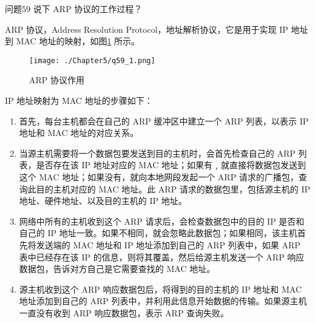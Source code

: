\documentclass[cn,11pt,color=blue,lang=cn]{elegantbook}
\begin{document}
\begin{custom}{问题59}
说下 ARP 协议的工作过程？
\end{custom}
\begin{solution}
ARP 协议，Address Resolution Protocol，地址解析协议，它是用于实现 IP 地址到 MAC 地址的映射，如图\ref{fig59_1} 所示。
\begin{figure}[!h]
\centering
\texttt{[image: ./Chapter5/q59\_1.png]}
\caption{ARP 协议作用}
\label{fig59_1}
\end{figure}

IP 地址映射为 MAC 地址的步骤如下：
\begin{enumerate}
	\item 首先，每台主机都会在自己的 ARP 缓冲区中建立一个 ARP 列表，以表示 IP 地址和 MAC 地址的对应关系。
	\item 当源主机需要将一个数据包要发送到目的主机时，会首先检查自己的 ARP 列表，是否存在该 IP 地址对应的 MAC 地址；如果有﹐就直接将数据包发送到这个 MAC 地址；如果没有，就向本地网段发起一个 ARP 请求的广播包，查询此目的主机对应的 MAC 地址。此 ARP 请求的数据包里，包括源主机的 IP 地址、硬件地址、以及目的主机的 IP 地址。
	\item 网络中所有的主机收到这个 ARP 请求后，会检查数据包中的目的 IP 是否和自己的 IP 地址一致。如果不相同，就会忽略此数据包；如果相同，该主机首先将发送端的 MAC 地址和 IP 地址添加到自己的 ARP 列表中，如果 ARP 表中已经存在该 IP 的信息，则将其覆盖，然后给源主机发送一个 ARP 响应数据包，告诉对方自己是它需要查找的 MAC 地址。
	\item 
源主机收到这个 ARP 响应数据包后，将得到的目的主机的 IP 地址和 MAC 地址添加到自己的 ARP 列表中，并利用此信息开始数据的传输。如果源主机一直没有收到 ARP 响应数据包，表示 ARP 查询失败。
\end{enumerate}
\end{solution}
	
\end{document}
